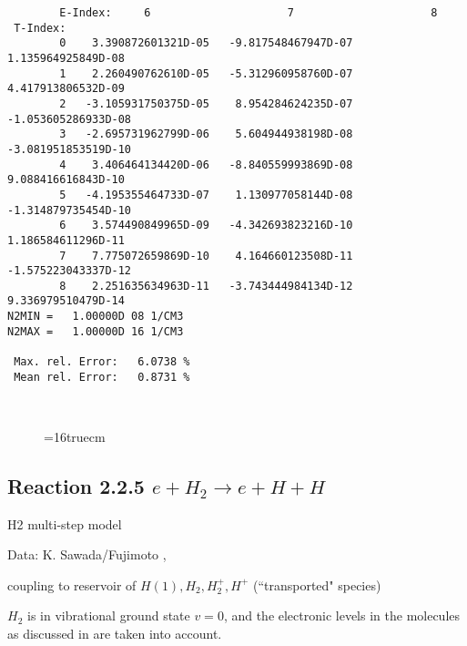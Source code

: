 \documentclass[12pt,dvipdfmx]{article}
\begin{document}
\begin{small}
\begin{verbatim}
        E-Index:     6                     7                     8
 T-Index:
        0    3.390872601321D-05   -9.817548467947D-07    1.135964925849D-08
        1    2.260490762610D-05   -5.312960958760D-07    4.417913806532D-09
        2   -3.105931750375D-05    8.954284624235D-07   -1.053605286933D-08
        3   -2.695731962799D-06    5.604944938198D-08   -3.081951853519D-10
        4    3.406464134420D-06   -8.840559993869D-08    9.088416616843D-10
        5   -4.195355464733D-07    1.130977058144D-08   -1.314879735454D-10
        6    3.574490849965D-09   -4.342693823216D-10    1.186584611296D-11
        7    7.775072659869D-10    4.164660123508D-11   -1.575223043337D-12
        8    2.251635634963D-11   -3.743444984134D-12    9.336979510479D-14
N2MIN =   1.00000D 08 1/CM3
N2MAX =   1.00000D 16 1/CM3

 Max. rel. Error:   6.0738 %
 Mean rel. Error:   0.8731 %



\end{verbatim}\end{small}
\begin{figure} \label{2.1.8b}
\epsfxsize=16truecm
\end{figure}
\newpage


\subsection{
Reaction 2.2.5    $e + H_2   \rightarrow e + H + H  $
}

H2 multi-step model

 Data: K. Sawada/Fujimoto ,\cite{kn:Sawada}

coupling to reservoir of $  H(1), H_2, H_2^+, H^+ $ (``transported" species)


$H_2$ is in vibrational ground state $v=0$, and the electronic levels
in the molecules as discussed in \cite{kn:Sawada} are taken into
account.
\end{document}
